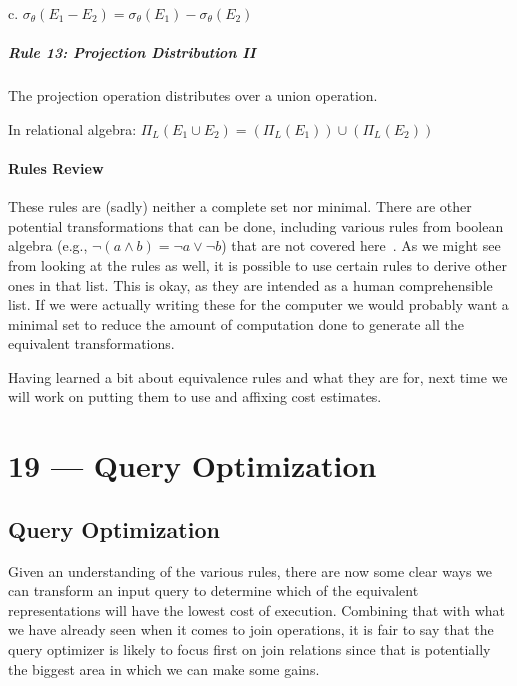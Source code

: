 \documentclass[a4paper]{report}
\begin{document}
c. $\sigma_{\theta}(E_{1} - E_{2}) = \sigma_{\theta}(E_{1}) - \sigma_{\theta}(E_{2})$

\paragraph{Rule 13: Projection Distribution II}
The projection operation distributes over a union operation.

In relational algebra: $\Pi_{L}(E_{1} \cup E_{2}) = (\Pi_{L}(E_{1}))\cup(\Pi_{L}(E_{2}))$

\subsubsection*{Rules Review}

These rules are (sadly) neither a complete set nor minimal. There are other potential transformations that can be done, including various rules from boolean algebra (e.g., $\neg (a \wedge b) = \neg a \vee \neg b$) that are not covered here~\cite{fds}. As we might see from looking at the rules as well, it is possible to use certain rules to derive other ones in that list. This is okay, as they are intended as a human comprehensible list. If we were actually writing these for the computer we would probably want a minimal set to reduce the amount of computation done to generate all the equivalent transformations. 

Having learned a bit about equivalence rules and what they are for, next time we will work on putting them to use and affixing cost estimates.









\chapter*{19 --- Query Optimization}


\section*{Query Optimization}

Given an understanding of the various rules, there are now some clear ways we can transform an input query to determine which of the equivalent representations will have the lowest cost of execution. Combining that with what we have already seen when it comes to join operations, it is fair to say that the query optimizer is likely to focus first on join relations since that is potentially the biggest area in which we can make some gains.
\end{document}
